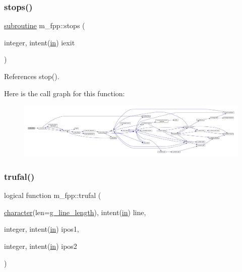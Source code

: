 \subsubsection{\texorpdfstring{stops()}{stops()}}
{\footnotesize\ttfamily \hyperlink{M__stopwatch_83_8txt_acfbcff50169d691ff02d4a123ed70482}{subroutine} m\+\_\+fpp\+::stops (\begin{DoxyParamCaption}\item[{integer, intent(\hyperlink{M__journal_83_8txt_afce72651d1eed785a2132bee863b2f38}{in})}]{iexit }\end{DoxyParamCaption})}



References stop().

Here is the call graph for this function\+:
\nopagebreak
\begin{figure}[H]
\begin{center}
\leavevmode
\includegraphics[width=350pt]{namespacem__fpp_a66a3f9b0087d5808a36fe4c19c47b51c_cgraph}
\end{center}
\end{figure}
\mbox{\label{namespacem__fpp_ad7c4d8aa34d0b35cd3b3ced65e261590}} 
\subsubsection{\texorpdfstring{trufal()}{trufal()}}
{\footnotesize\ttfamily logical function m\+\_\+fpp\+::trufal (\begin{DoxyParamCaption}\item[{\hyperlink{option__stopwatch_83_8txt_abd4b21fbbd175834027b5224bfe97e66}{character}(len=\hyperlink{namespacem__fpp_ab93f8756cf248cf8db932573009d4664}{g\+\_\+line\+\_\+length}), intent(\hyperlink{M__journal_83_8txt_afce72651d1eed785a2132bee863b2f38}{in})}]{line,  }\item[{integer, intent(\hyperlink{M__journal_83_8txt_afce72651d1eed785a2132bee863b2f38}{in})}]{ipos1,  }\item[{integer, intent(\hyperlink{M__journal_83_8txt_afce72651d1eed785a2132bee863b2f38}{in})}]{ipos2 }\end{DoxyParamCaption})}



